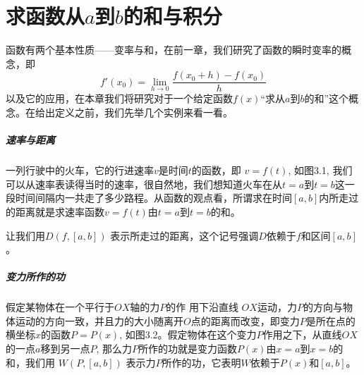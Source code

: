 \chapter{求函数从$a$到$b$的和与积分}
函数有两个基本性质——变率与和，在前一章，我们研究了函数的瞬时变率的概念，即
\[f'(x_0) =\lim_{h\to 0} \frac{f (x_0+h) -f (x_0)}{h}\]
以及它的应用，在本章我们将研究对于一个给定函数$f(x)$“求从$a$到$b$的和”这个概念。在给出定义之前，我们先举几个实例来看一看。

\paragraph{速率与距离} 
一列行驶中的火车，它的行进速率$v$是时间$t$的函数，即
$v=f(t)$, 如图3.1, 我们可以从速率表读得当时的速率，很自然地，我们想知道火车在从$t=a$到$t=b$这一段时间间隔内一共走了多少路程。从函数的观点看，所谓求在时间$[a,b]$内所走过的距离就是求速率函数$v=f(t)$由$t=a$到$t=b$的和。

\begin{figure}[htp]
    \centering
{}
    \caption{}
\end{figure}

让我们用$D(f,[a,b])$
表示所走过的距离，这个记号强调$D$依赖于$f$和区间$[a,b]$。

\paragraph{变力所作的功}

假定某物体在一个平行于$OX$轴的力$P$的作 用下沿直线
$OX$运动，力$P$的方向与物体运动的方向一致，并且力的大小随离开$O$点的距离而改变，即变力$P$是所在点的横坐标$x$的函数$P=P(x)$, 如图3.2。假定物体在这个变力$P$作用之下，从直线$OX$的一点$a$移到另一点$P$, 那么力$P$所作的功就是变力函数$P(x)$由$x=a$到$x=b$的和，我们用
$W (P, [a,b])$
表示力$P$所作的功，它表明$W$依赖于$P(x)$和$[a,b]$。

